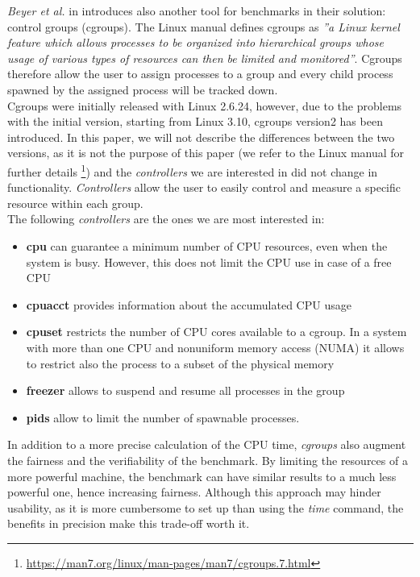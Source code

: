 \textit{Beyer et al.} in \cite{Beyer2017ReliableBR} introduces also another tool for benchmarks in their solution: control groups (cgroups). The Linux manual defines cgroups as \textit{''a Linux kernel feature which allows processes to be organized into hierarchical groups whose usage of various types of resources can then be limited and monitored''}. \cite{LinuxManualWeb} Cgroups therefore allow the user to assign processes to a group and every child process spawned by the assigned process will be tracked down. \\
Cgroups were initially released with Linux 2.6.24, however, due to the problems with the initial version, starting from Linux 3.10, cgroups version2 has been introduced. In this paper, we will not describe the differences between the two versions, as it is not the purpose of this paper (we refer to the Linux manual for further details \footnote{ \url{https://man7.org/linux/man-pages/man7/cgroups.7.html}}) and the \textit{controllers} we are interested in did not change in functionality.  \textit{Controllers} allow the user to easily control and measure a specific resource within each group. \cite{Beyer2017ReliableBR}\\
The following \textit{controllers} are the ones we are most interested in:
\begin{itemize}
    \item[] \textbf{cpu} \quad    can guarantee a minimum number of CPU resources, even when the system is busy. However, this does not limit the CPU use in case of a free CPU
    \item[] \textbf{cpuacct} \quad provides information about the accumulated CPU usage
    \item[] \textbf{cpuset} \quad restricts the number of CPU cores available to a cgroup. In a system with more than one CPU and nonuniform memory access (NUMA) it allows to restrict also the process to a subset of the physical memory  \cite{Beyer2017ReliableBR}
    \item[] \textbf{freezer} \quad allows to suspend and resume all processes in the group
    \item[] \textbf{pids} \quad allow to limit the number of spawnable processes. 
\end{itemize}
In addition to a more precise calculation of the CPU time, \textit{cgroups} also augment the fairness and the verifiability of the benchmark. By limiting the resources of a more powerful machine, the benchmark can have similar results to a much less powerful one, hence increasing fairness. 
Although this approach may hinder usability, as it is more cumbersome to set up than using the \textit{time} command, the benefits in precision make this trade-off worth it. 
